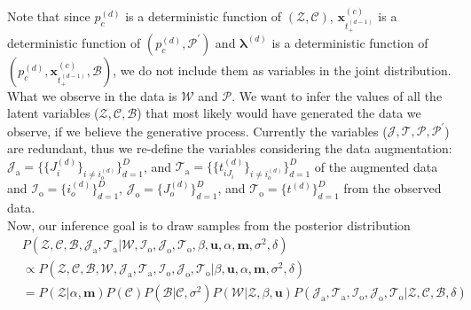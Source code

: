 \documentclass[a4paper]{article}
\begin{document}
	  Note that since $p_c^{(d)}$ is a deterministic function of $(\mathcal{Z}, \mathcal{C})$, $\boldsymbol{x}_{t_+^{(d-1)}}^{(c)}$ is a deterministic function of $(p_c^{(d)}, \mathcal{P}^{\prime})$  and $\boldsymbol{\lambda}^{(d)}$ is a deterministic function of $(p_c^{(d)}, \boldsymbol{x}_{t_+^{(d-1)}}^{(c)}, \mathcal{B})$, we do not include them as variables in the joint distribution. \\ \newline
	 What we observe in the data is $\mathcal{W}$ and $\mathcal{P}$. We want to infer the values of all the latent variables ($\mathcal{Z}, \mathcal{C}, \mathcal{B}$) that most likely would have generated the data we observe, if we believe the generative process. Currently the variables ($\mathcal{J}, \mathcal{T}, \mathcal{P}, \mathcal{P^\prime}$) are redundant, thus we re-define the variables considering the data augmentation:  $\mathcal{J}_{\mbox{a}}=\{\{J_i^{(d)}\}_{i\neq i_o^{(d)}}\}_{d=1}^D$, and $\mathcal{T}_{\mbox{a}}=\{\{t_{iJ_i}^{(d)}\}_{i\neq i_o^{(d)}}\}_{d=1}^D$ of the augmented data and $\mathcal{I}_{\mbox{o}}=\{i_o^{(d)}\}_{d=1}^D$,  $\mathcal{J}_{\mbox{o}}=\{J_o^{(d)}\}_{d=1}^D$, and $\mathcal{T}_{\mbox{o}}= \{t^{(d)}\}_{d=1}^D$ from the observed data.\\ \newline
	  Now, our inference goal is to draw samples from the posterior distribution
	  \begin{equation}
	  \begin{aligned}
	  &P(\mathcal{Z}, \mathcal{C}, \mathcal{B}, \mathcal{J}_{\mbox{a}}, \mathcal{T}_{\mbox{a}}|\mathcal{W}, \mathcal{I}_{\mbox{o}}, \mathcal{J}_{\mbox{o}}, \mathcal{T}_{\mbox{o}}, \beta, \boldsymbol{u}, \alpha, \boldsymbol{m}, \sigma^2,  \delta) \\
	  &\propto 	P(\mathcal{Z}, \mathcal{C}, \mathcal{B}, \mathcal{W}, \mathcal{J}_{\mbox{a}}, \mathcal{T}_{\mbox{a}},\mathcal{I}_{\mbox{o}}, \mathcal{J}_{\mbox{o}}, \mathcal{T}_{\mbox{o}} |\beta, \boldsymbol{u}, \alpha, \boldsymbol{m}, \sigma^2, \delta)\\&  = P(\mathcal{Z}|\alpha, \boldsymbol{m})P(\mathcal{C})P(\mathcal{B}|\mathcal{C}, \sigma^2)P(\mathcal{W}|\mathcal{Z}, \beta, \boldsymbol{u})P(\mathcal{J}_{\mbox{a}}, \mathcal{T}_{\mbox{a}},\mathcal{I}_{\mbox{o}}, \mathcal{J}_{\mbox{o}}, \mathcal{T}_{\mbox{o}} |\mathcal{Z}, \mathcal{C}, \mathcal{B}, \delta)
	  \end{aligned}
	  \end{equation}
\end{document}
